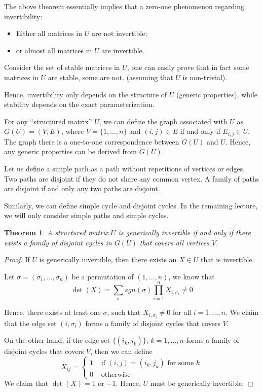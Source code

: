 \documentclass{article}
\newtheorem{theorem}{Theorem}
\begin{document}
The above theorem essentially implies that a zero-one phenomenon regarding invertibility:
\begin{itemize}
  \item Either all matrices in $U$ are not invertible;
  \item or almost all matrices in $U$ are invertible.
\end{itemize}

Consider the set of stable matrices in $U$, one can easily prove that in fact some matrices in $U$ are stable, some are not. (assuming that $U$ is non-trivial).

Hence, invertibility only depends on the structure of $U$ (generic properties), while stability depends on the exact parameterization. 

For any ``structured matrix'' $U$, we can define the graph associated with $U$ as $G(U) = (V,E)$, where $V = \{1,\dots,n\}$ and $(i,j)\in E$ if and only if $E_{i,j}\in U$. The graph there is a one-to-one correspondence between $G(U)$ and $U$. Hence, any generic properties can be derived from $G(U)$.

Let us define a simple path as a path without repetitions of vertices or edges. Two paths are disjoint if they do not share any common vertex. A family of paths are disjoint if and only any two paths are disjoint.

Similarly, we can define simple cycle and disjoint cycles. In the remaining lecture, we will only consider simple paths and simple cycles.

\begin{theorem}
  A structured matrix $U$ is generically invertible if and only if there exists a family of disjoint cycles in $G(U)$ that covers all vertices $V$.
\end{theorem}
\begin{proof}
  If $U$ is generically invertible, then there exists an $X\in U$ that is invertible.

  Let $\sigma = (\sigma_1,\dots,\sigma_n)$ be a permutation of $(1,\dots,n)$, we know that
  \begin{displaymath}
    \det(X) = \sum_{\sigma} sgn(\sigma) \prod_{i=1}^n X_{i,\sigma_i}\neq 0
  \end{displaymath}

  Hence, there exists at least one $\sigma$, such that $X_{i,\sigma_i}\neq 0$ for all $i=1,\dots,n$. We claim that the edge set $(i,\sigma_i)$ forms a family of disjoint cycles that covers $V$.

  On the other hand, if the edge set $\{(i_k,j_k)\}$, $k=1,\dots,n$ forms a family of disjoint cycles that covers $V$, then we can define 
\begin{displaymath}
  X_{ij} = \begin{cases}
    1&\text{ if } (i,j)=(i_k,j_k)\text{ for some }k\\
    0&\text{ otherwise}
  \end{cases}
\end{displaymath}
We claim that $\det(X) = 1$ or $-1$. Hence, $U$ must be generically invertible.
\end{proof}
\end{document}
